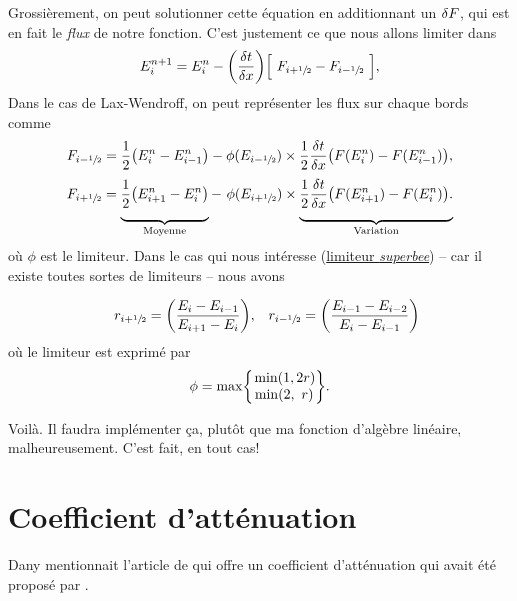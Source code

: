 \documentclass[10pt]{article}
\numberwithin{equation}{section}
\newcommand{\tall}{\vphantom{pA^{x^x}_p}}
\newcommand{\venti}{\vphantom{\sum_x^x}}
\newcommand{\pt}{\hspace{1pt}} %
\begin{document}
Grossièrement, on peut solutionner cette équation en additionnant un \(\var{F}\), qui est en fait le \emph{flux} de notre fonction.
C'est justement ce que nous allons limiter dans 
\begin{equation}
   E_i^{n+1} = E_i^n - \qty(\frac{\var{t}}{\var{x}})\qty[\tall\ F_{i+\sfrac{1}{2}} - F_{i-\sfrac{1}{2}}\ ],
\end{equation}
Dans le cas de Lax-Wendroff, on peut représenter les flux sur chaque bords comme
\begin{subequations}
\begin{align}
   &F_{i-\sfrac{1}{2}} = \frac{1}{2}\qty(E_i^n - E_{i-1}^n) - \phi(E_{i-\sfrac{1}{2}}) \times\frac{1}{2}\fdv{t}{x}\qty(F(E_i^n) - F(E_{i-1}^n)),\\
   &F_{i+\sfrac{1}{2}} = \underbrace{\venti\frac{1}{2}\qty(E_{i+1}^n - E_i^n)}_{\mathrm{Moyenne}} - \ \phi(E_{i+\sfrac{1}{2}}) \times\underbrace{\venti\frac{1}{2}\fdv{t}{x}\qty(F(E_{i+1}^n) - F(E_i^n)).}_{\mathrm{Variation}}
\end{align}
\end{subequations}
où \(\phi\) est le limiteur.
Dans le cas qui nous intéresse (\href{https://en.wikipedia.org/wiki/Flux\_limiter}{limiteur \emph{superbee}})  -- car il existe toutes sortes de limiteurs -- nous avons

\begin{align}
   && && &&r_{i+\sfrac{1}{2}} = \qty(\frac{E_i - E_{i-1}}{E_{i+1} - E_i}),    && r_{i-\sfrac{1}{2}} = \qty(\frac{E_{i-1} - E_{i-2}}{E_{i} - E_{i-1}}) && &&
\end{align}
où le limiteur est exprimé par
\begin{equation}
   \phi = \mathrm{max} \qty{\begin{matrix}
       \pt\mathrm{min}(1, 2r)\\
       \mathrm{min}(2,\ r)\\
   \end{matrix}
   }.
\end{equation}

Voilà. Il faudra implémenter ça, plutôt que ma fonction d'algèbre linéaire, malheureusement.
C'est fait, en tout cas!
\section{Coefficient d'atténuation}
\label{sec:orge769e47}

Dany mentionnait l'article de \Textcite{auclair2022model} qui offre un coefficient d'atténuation qui avait été proposé par \Textcite{sutherland2019two}.
\end{document}
